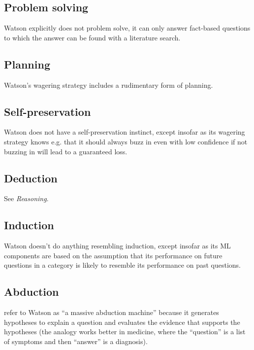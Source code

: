 \documentclass[10pt,a4paper]{article}
\newcommand{\nquote}[1]{``{#1}''}
\begin{document}
\subsection{Problem solving}
Watson explicitly does not problem solve, it can only answer fact-based questions to which the answer can be found with a literature search.

\subsection{Planning}
Watson's wagering strategy includes a rudimentary form of planning.

\subsection{Self-preservation}
Watson does not have a self-preservation instinct, except insofar as its wagering strategy knows e.g. that it should always buzz in even with low confidence if not buzzing in will lead to a guaranteed loss.

\subsection{Deduction}
See \emph{Reasoning}.

\subsection{Induction}
Watson doesn't do anything resembling induction, except insofar as its ML components are based on the assumption that its performance on future questions in a category is likely to resemble its performance on past questions.

\subsection{Abduction}
\cite{watsonmedicine} refer to Watson as \nquote{a massive abduction machine} because it generates hypotheses to explain a question and evaluates the evidence that supports the hypotheses (the analogy works better in medicine, where the \nquote{question} is a list of symptoms and then \nquote{answer} is a diagnosis).


\end{document}

